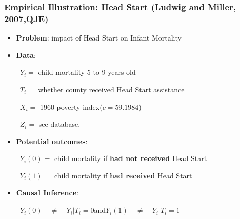 \documentclass[9pt]{beamer}
\renewcommand{\c}{c}
\begin{document}
\begin{frame}\frametitle{Empirical Illustration: Head Start (Ludwig and Miller, 2007,QJE)}
	\begin{itemize}
		\item \textbf{Problem}: impact of Head Start on Infant Mortality\bigskip
		
		\item \textbf{Data}:\medskip
		
		~\qquad$Y_{i}=$ child mortality 5 to 9 years old\medskip
		
		~\qquad$T_{i}=$ whether county received Head Start assistance\medskip
		
		~\qquad$X_{i}=$ 1960 poverty index\quad($\c=59.1984$)\medskip
		
		~\qquad$Z_{i}=$ see database.\bigskip
		
		\item \textbf{Potential outcomes}:\medskip
		
		~\qquad$Y_{i}(0)=$ child mortality if \textbf{had not received} Head
		Start\medskip
		
		~\qquad$Y_{i}(1)=$ child mortality if \textbf{had received} Head Start\bigskip
		
		\item \textbf{Causal Inference}:\medskip
		
		~\qquad$Y_{i}(0) \quad\neq\quad Y_{i}|T_{i}=0$\qquad\qquad and\qquad\qquad$Y_{i}(1) \quad\neq\quad Y_{i}|T_{i}=1$\bigskip
	\end{itemize}
\end{frame}
\end{document}
